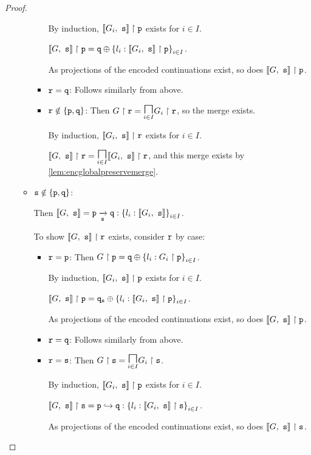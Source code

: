 \begin{proof}
\begin{enumerate}
\begin{itemize}
\begin{itemize}
By induction, $\proj{\enc{G_i}{s}}{p}$ exists for $i \in I$.

$\proj{\enc{G}{s}}{p} = \tsel{q}{l_i: \proj{\enc{G_i}{s}}{p}}{i \in I}$.

As projections of the encoded continuations exist, 
so does $\proj{\enc{G}{s}}{p}$.

\item $\mrole{r} = \mrole{q}$: Follows similarly from above.

\item $\mrole{r} \notin \{\mrole{p},\mrole{q}\}$:
Then $\proj{G}{r} = \underset{i \in I}{\MERGEOP}\proj{G_i}{r}$,
so the merge exists.

By induction, $\proj{\enc{G_i}{s}}{r}$ exists for $i \in I$.

$\proj{\enc{G}{s}}{r} = 
	\underset{i \in I}{\MERGEOP}\proj{\enc{G_i}{s}}{r}$,
and this merge exists by \cref{lem:encglobalpreservemerge}.

\end{itemize}

\item $\mrole{s} \notin \{ \mrole{p}, \mrole{q} \}$:

Then $\enc{G}{s} = \groute{p}{q}{s}{l_i: \enc{G_i}{s}}{i \in I}$.

To show $\proj{\enc{G}{s}}{r}$ exists,
consider $\mrole{r}$ by case:

\begin{itemize}
\item $\mrole{r} = \mrole{p}$:
Then $\proj{G}{p} = \tsel{q}{l_i: \proj{G_i}{p}}{i \in I}$.

By induction, $\proj{\enc{G_i}{s}}{p}$ exists for $i \in I$.

$\proj{\enc{G}{s}}{p} = 
	\tselproxy{q}{s}{l_i: \proj{\enc{G_i}{s}}{p}}{i \in I}$.

As projections of the encoded continuations exist, 
so does $\proj{\enc{G}{s}}{p}$.

\item $\mrole{r} = \mrole{q}$: Follows similarly from above.
\item $\mrole{r} = \mrole{s}$:
Then $\proj{G}{s} = \underset{i \in I}{\MERGEOP}\proj{G_i}{s}$.

By induction, $\proj{\enc{G_i}{s}}{p}$ exists for $i \in I$.

$\proj{\enc{G}{s}}{s} = 
	\router{p}{q}{l_i: \proj{\enc{G_i}{s}}{s}}{i \in I}$.

As projections of the encoded continuations exist, 
so does $\proj{\enc{G}{s}}{s}$.


\end{itemize}
\end{itemize}
\end{enumerate}
\end{proof}
